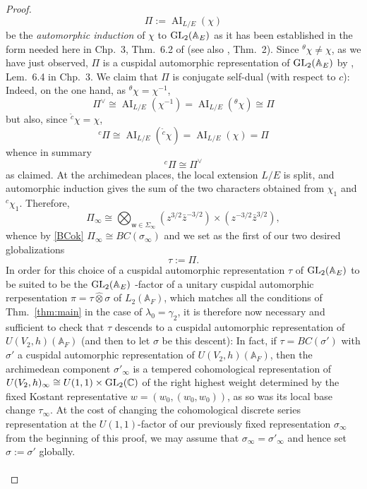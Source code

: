 \documentclass[a4paper,10pt]{amsart}
\theoremstyle{definition}
\numberwithin{equation}{section}
\def\A{\mathbb A}
\def\C{\mathbb C}
\def\ww{\mathsf w}
\def\GL{{\rm GL}}
\begin{document}
\begin{proof}
$$
        \Pi:=\operatorname{AI}_{L/E}(\chi)
$$
be the {\it automorphic induction} of $\chi$ to \(\GL_2(\mathbb A_E)\) as it has been established in the form needed here in Chp.\ 3, Thm.\ 6.2 of \cite{arthur-clozel} (see also \cite{henniart12}, Thm.\ 2). Since ${}^\theta\chi\neq\chi$, as we have just observed, \(\Pi\) is a cuspidal automorphic representation of \(\GL_2(\mathbb A_E)\) by  \cite{arthur-clozel}, Lem.\ 6.4 in Chp.\ 3. We claim that $\Pi$ is conjugate self-dual (with respect to $c$): Indeed, on the one hand, as ${}^\theta\chi=\chi^{-1}$,
$$ \Pi^\vee
        \cong
        \operatorname{AI}_{L/E}(\chi^{-1})
        =
        \operatorname{AI}_{L/E}({}^\theta\chi)
        \cong
        \Pi$$
but also, since  \( {}^{\widetilde c}\chi=\chi\), 
$$
        {}^c\Pi
        \cong
        \operatorname{AI}_{L/E}({}^{\widetilde c}\chi)
        =
        \operatorname{AI}_{L/E}(\chi)
      =
        \Pi
$$
whence in summary
$$
        {}^c\Pi\cong\Pi^\vee
$$
as claimed. At the archimedean places, the local extension \(L/E\) is split, and
automorphic induction gives the sum of the two characters obtained from
\(\chi_1\) and \({}^c\chi_1\). Therefore,
$$
        \Pi_\infty\cong \bigotimes_{\ww\in\Sigma_\infty}
        \left(z^{3/2}\bar z^{-3/2}\right)
        \times
        \left(z^{-3/2}\bar z^{3/2}\right),
$$
whence by \eqref{BCok} $\Pi_\infty\cong BC(\sigma_\infty)$ and we set as the first of our two desired globalizations
$$
\tau:=\Pi.       
$$
In order for this choice of a cuspidal automorphic representation $\tau$ of \(\GL_2(\mathbb A_E)\) to be suited to be the \(\GL_2(\mathbb A_E)\) -factor of a unitary cuspidal automorphic rerpesentation $\pi=\tau\hat\otimes\sigma$ of $L_2(\A_F)$, which matches all the conditions of Thm.\ \ref{thm:main} in the case of $\lambda_0=\gamma_2$, it is therefore now necessary and sufficient to check that $\tau$ descends to a cuspidal automorphic representation of $U(V_2,h)(\A_F)$ (and then to let $\sigma$ be this descent): In fact, if $\tau=BC(\sigma')$ with $\sigma'$ a cuspidal automorphic representation of $U(V_2,h)(\A_F)$, then the archimedean component $\sigma'_\infty$ is a tempered cohomological representation of $U(V_2,h)_\infty\cong U(1,1)\times \GL_2(\C)$ of the right highest weight determined by the fixed Kostant representative $w=(w_0,(w_0,w_0))$, as so was its local base change $\tau_\infty$. At the cost of changing the cohomological discrete series representation at the $U(1,1)$-factor of our previously fixed representation $\sigma_\infty$ from the beginning of this proof, we may assume that $\sigma_\infty=\sigma'_\infty$ and hence set $\sigma:=\sigma'$ globally. \\\\ 

\end{proof}
\end{document}

